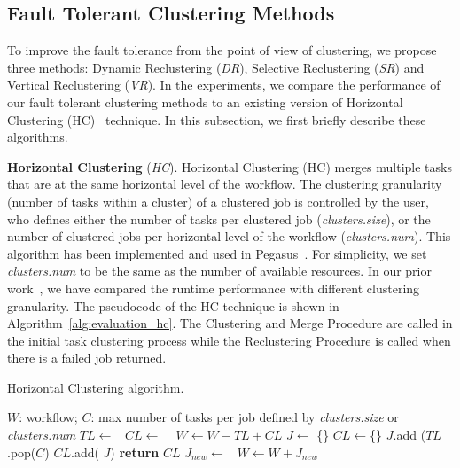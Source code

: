 \subsection{Fault Tolerant Clustering Methods}

To improve the fault tolerance from the point of view of clustering, we propose three methods: Dynamic Reclustering (\emph{DR}), Selective Reclustering (\emph{SR}) and Vertical Reclustering (\emph{VR}). In the experiments, we compare the performance of our fault tolerant clustering methods to an existing version of Horizontal Clustering (HC)~\cite{Singh2008} technique. In this subsection, we first briefly describe these algorithms.

\textbf{Horizontal Clustering} (\emph{HC}). 
Horizontal Clustering (HC) merges multiple tasks that are at the same horizontal level of the workflow. The clustering granularity (number of tasks within a cluster) of a clustered job is controlled by the user, who defines either the number of tasks per clustered job (\emph{clusters.size}), or the number of clustered jobs per horizontal level of the workflow (\emph{clusters.num}). This algorithm has been implemented and used in Pegasus~\cite{Singh2008}. For simplicity, we set \emph{clusters.num} to be the same as the number of available resources. In our prior work~\cite{Chen2013a,Chen2013b}, we have compared the runtime performance with different clustering granularity. The pseudocode of the HC technique is shown in Algorithm~\ref{alg:evaluation_hc}. The Clustering and Merge Procedure are called in the initial task clustering process while the Reclustering Procedure is called when there is a failed job returned. 

\begin{algorithm}[!htb]
	\footnotesize
	\caption{Horizontal Clustering algorithm.}
	\label{alg:evaluation_hc}
	\begin{algorithmic}[1]
		\Require $W$: workflow; $C$: max number of tasks per job defined by \emph{clusters.size} or \emph{clusters.num}
				\State $TL\gets $\  
				\State $CL\gets$  \  
				\State $W \gets W - TL + CL$   
			\EndFor
		\EndProcedure
			\State $J\gets$ \{\}
			\State $CL\gets$\{\}
				\State $J$.add ($TL$.pop($C$) 
				\State  $CL$.add( $J$)
			\EndWhile
			\State \textbf{return} $CL$
		\EndProcedure
			\State $J_{new}\gets$\  
			\State $W \gets W + J_{new}$ 
		\EndProcedure
	\end{algorithmic}
\end{algorithm}


